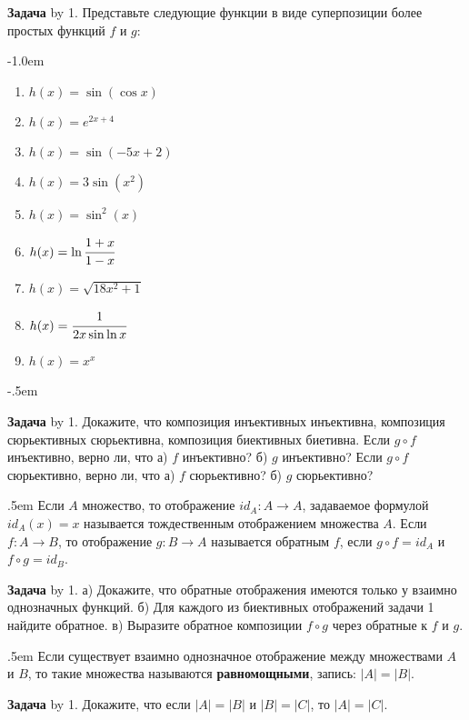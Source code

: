 \documentclass[a4paper,10pt]{article}
\def\problem{\textbf{Задача \the\problemnum}\advance\problemnum by 1}
\begin{document}
{\problem. Представьте следующие функции в виде суперпозиции более простых функций $f$ и $g$: \par\kern-1.0em
\begin{multicols}{3}
	\begin{enumerate}[label=(\arabic*)\,]
		\item $h(x) = \sin(\cos x)$
		\item $h(x) = e^{2x+4}$
		\item $h(x) = \sin(-5x+2)$
		\item $h(x) = 3\sin(x^2)$
		\item $h(x) = \sin^2(x)$
		\item $h(x) = \ln \cfrac{1+x}{1-x}$
		\item $h(x) = \sqrt{18x^2+1}$
		\item $h(x) = \cfrac1{2x\sin\ln x}$
		\item $h(x) = x^x$
	\end{enumerate}
\end{multicols}
\par\kern-.5em

\problem. Докажите, что композиция инъективных инъективна, композиция сюрьективных сюрьективна, композиция биективных биетивна. Если $g\circ f$ инъективно, верно ли, что а) $f$ инъективно? б) $g$ инъективно? Если $g\circ f$ сюрьективно, верно ли, что а) $f$ сюрьективно? б) $g$ сюрьективно?
\par\kern.5em
Если $A$ множество, то отображение $id_A: A\to A$, задаваемое формулой $id_A(x)=x$ называется тождественным отображением множества $A$. Если $f: A\to B$, то отображение $g: B\to A$ называется обратным $f$, если $g\circ f=id_A$ и $f\circ g=id_B$.

\problem. а) Докажите, что обратные отображения имеются только у взаимно однозначных функций. б) Для каждого из биективных отображений задачи 1 найдите обратное. в) Выразите обратное композиции $f\circ g$ через обратные к $f$ и $g$.
\par\kern.5em
Если существует взаимно однозначное отображение между множествами $A$ и $B$, то такие множества называются \textbf{равномощными}, запись: $|A|=|B|$.

\problem. Докажите, что если $|A|=|B|$ и $|B|=|C|$, то $|A|=|C|$.
}
\newpage
\end{document}

